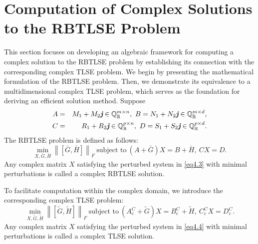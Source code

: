 \documentclass[preprint,11pt,3p]{elsarticle}
\newcommand\norm[1]{\left\lVert#1\right\rVert}
\def \QR{\mathbb{Q}_\mathbb{R}}
\def \j{\textit{\textbf{j}}}
\begin{document}
\section{Computation of Complex Solutions to the RBTLSE Problem}\label{sec4}
This section focuses on developing an algebraic framework for computing a complex solution to the RBTLSE problem by establishing its connection with the corresponding complex TLSE problem. We begin by presenting the mathematical formulation of the RBTLSE problem. Then, we demonstrate its equivalence to a multidimensional complex TLSE problem, which serves as the foundation for deriving an efficient solution method. Suppose 
\begin{eqnarray}
	A&=& M_1+M_2\j \in  \QR^{m \times n}, ~ B= N_1+N_2\j \in \QR^{m \times d}, \label{eq4.1} \\ 
	C&=& R_1+R_2\j \in  \QR^{p \times n}, ~ D= S_1+S_2\j \in \QR^{p \times d}. \label{eq4.2}
\end{eqnarray}
The RBTLSE problem is defined as follows:
\begin{equation}\label{eq4.3}
	\min_{X,\bar{G},\bar{H}}\norm{[\bar{G}, \bar{H}]}_F ~ \textrm{subject to} ~ (A+\bar{G})X = B+\bar{H}, ~ CX=D. 
\end{equation} 
Any complex matrix $X$ satisfying the perturbed system in \eqref{eq4.3} with minimal perturbations is called a complex RBTLSE solution.

To facilitate computation within the complex domain, we introduce the corresponding complex TLSE problem:
\begin{equation}\label{eq4.4}
	\min_{X,\widetilde{G}, \widetilde{H}} \norm{[\widetilde{G}, \widetilde{H}]}_F ~ \textrm{subject to} ~ (A^C_c+\widetilde{G})X=B^C_c+ \widetilde{H}, ~ C^C_cX=D^C_c.
\end{equation}
Any complex matrix $X$ satisfying the perturbed system in \eqref{eq4.4} with minimal perturbations is called a complex TLSE solution.
\end{document}
